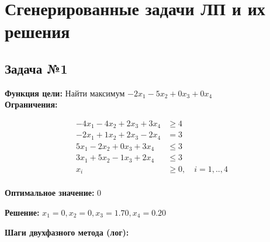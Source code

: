 \documentclass[a4paper,12pt]{article}
\begin{document}
\section*{Сгенерированные задачи ЛП и их решения}

\subsection*{Задача №1}
\textbf{Функция цели: }
Найти максимум $ -2x_{1} -5x_{2} +0x_{3} +0x_{4} $\\

\textbf{Ограничения:}

\[ \begin{aligned}
-4x_{1} -4x_{2} +2x_{3} +3x_{4} &\ge 4 \\
-2x_{1} +1x_{2} +2x_{3} -2x_{4} &= 3 \\
5x_{1} -2x_{2} +0x_{3} +3x_{4} &\le 3 \\
3x_{1} +5x_{2} -1x_{3} +2x_{4} &\le 3 \\
x_i &\ge 0,\quad i=1,..,4\\
\end{aligned}\]

\textbf{Оптимальное значение: }$0$

\textbf{Решение: }$x_{1}=0, x_{2}=0, x_{3}=1.70, x_{4}=0.20$

\textbf{Шаги двухфазного метода (лог):}
\end{document}
